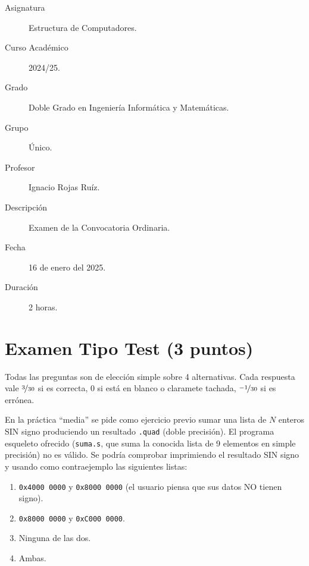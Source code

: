 \documentclass[12pt]{article}
\begin{document}

    
    

    \begin{description}
        \item[Asignatura] Estructura de Computadores.
        \item[Curso Académico] 2024/25.
        \item[Grado] Doble Grado en Ingeniería Informática y Matemáticas.
        \item[Grupo] Único.
        \item[Profesor] Ignacio Rojas Ruíz.
        \item[Descripción] Examen de la Convocatoria Ordinaria.
        \item[Fecha] 16 de enero del 2025.
        \item[Duración] 2 horas.
    
    \end{description}
    \newpage


    
    \section*{Examen Tipo Test (3 puntos)}
    \noindent
    Todas las preguntas son de elección simple sobre 4 alternativas.
    Cada respuesta vale $\nicefrac{3}{30}$ si es correcta, 0 si está en blanco o claramete tachada, $\nicefrac{-1}{30}$ si es errónea.
    \begin{ejercicio}
        En la práctica ``media'' se pide como ejercicio previo sumar una lista de $N$ enteros SIN signo produciendo un resultado \verb|.quad| (doble precisión). El programa esqueleto ofrecido (\verb|suma.s|, que suma la conocida lista de 9 elementos en simple precisión) no es válido. Se podría comprobar imprimiendo el resultado SIN signo y usando como contraejemplo las siguientes listas:
        \begin{enumerate}[label=\alph*)]
            \item \verb|0x4000 0000| y \verb|0x8000 0000| (el usuario piensa que sus datos NO tienen signo).
            \item \verb|0x8000 0000| y \verb|0xC000 0000|.
            \item Ninguna de las dos.
            \item Ambas.
        \end{enumerate}
    \end{ejercicio}
\end{document}
